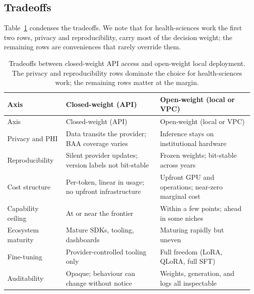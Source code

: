 \documentclass[
  letterpaper,
  11pt]{scrbook}
\begin{document}
\subsection{Tradeoffs}\label{tradeoffs}

Table~\ref{tbl-weight-regimes} condenses the tradeoffs. We note that for
health-sciences work the first two rows, privacy and reproducibility,
carry most of the decision weight; the remaining rows are conveniences
that rarely override them.

\begin{longtable}[]{@{}
  >{\raggedright\arraybackslash}p{}
  >{\raggedright\arraybackslash}p{}
  >{\raggedright\arraybackslash}p{}@{}}
\caption{Tradeoffs between closed-weight API access and open-weight
local deployment. The privacy and reproducibility rows dominate the
choice for health-sciences work; the remaining rows matter at the
margin.}\label{tbl-weight-regimes}\tabularnewline
\toprule\noalign{}
\begin{minipage}[b]{\linewidth}\raggedright
Axis
\end{minipage} & \begin{minipage}[b]{\linewidth}\raggedright
Closed-weight (API)
\end{minipage} & \begin{minipage}[b]{\linewidth}\raggedright
Open-weight (local or VPC)
\end{minipage} \\
\midrule\noalign{}
\endfirsthead
\toprule\noalign{}
\begin{minipage}[b]{\linewidth}\raggedright
Axis
\end{minipage} & \begin{minipage}[b]{\linewidth}\raggedright
Closed-weight (API)
\end{minipage} & \begin{minipage}[b]{\linewidth}\raggedright
Open-weight (local or VPC)
\end{minipage} \\
\midrule\noalign{}
\endhead
\bottomrule\noalign{}
\endlastfoot
Privacy and PHI & Data transits the provider; BAA coverage varies &
Inference stays on institutional hardware \\
Reproducibility & Silent provider updates; version labels not bit-stable
& Frozen weights; bit-stable across years \\
Cost structure & Per-token, linear in usage; no upfront infrastructure &
Upfront GPU and operations; near-zero marginal cost \\
Capability ceiling & At or near the frontier & Within a few points;
ahead in some niches \\
Ecosystem maturity & Mature SDKs, tooling, dashboards & Maturing rapidly
but uneven \\
Fine-tuning & Provider-controlled tooling only & Full freedom (LoRA,
QLoRA, full SFT) \\
Auditability & Opaque; behaviour can change without notice & Weights,
generation, and logs all inspectable \\
\end{longtable}
\end{document}
